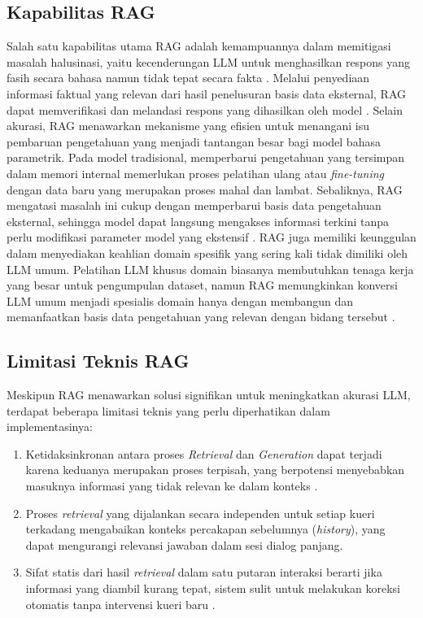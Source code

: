 \subsection{Kapabilitas RAG}
Salah satu kapabilitas utama RAG adalah kemampuannya dalam memitigasi masalah halusinasi, yaitu kecenderungan LLM untuk menghasilkan respons yang fasih secara bahasa namun tidak tepat secara fakta \parencite{Wu2024Retrieval}. Melalui penyediaan informasi faktual yang relevan dari hasil penelusuran basis data eksternal, RAG dapat memverifikasi dan melandasi respons yang dihasilkan oleh model \parencite{Wu2024Retrieval}.
Selain akurasi, RAG menawarkan mekanisme yang efisien untuk menangani isu pembaruan pengetahuan yang menjadi tantangan besar bagi model bahasa parametrik. Pada model tradisional, memperbarui pengetahuan yang tersimpan dalam memori internal memerlukan proses pelatihan ulang atau \textit{fine-tuning} dengan data baru yang merupakan proses mahal dan lambat. Sebaliknya, RAG mengatasi masalah ini cukup dengan memperbarui basis data pengetahuan eksternal, sehingga model dapat langsung mengakses informasi terkini tanpa perlu modifikasi parameter model yang ekstensif \parencite{Wu2024Retrieval}.
RAG juga memiliki keunggulan dalam menyediakan keahlian domain spesifik yang sering kali tidak dimiliki oleh LLM umum. Pelatihan LLM khusus domain biasanya membutuhkan tenaga kerja yang besar untuk pengumpulan dataset, namun RAG memungkinkan konversi LLM umum menjadi spesialis domain hanya dengan membangun dan memanfaatkan basis data pengetahuan yang relevan dengan bidang tersebut \parencite{Wu2024Retrieval}.


\subsection{Limitasi Teknis RAG}
Meskipun RAG menawarkan solusi signifikan untuk meningkatkan akurasi LLM, terdapat beberapa limitasi teknis yang perlu diperhatikan dalam implementasinya:

\begin{enumerate}[label=\arabic*.]
    \item Ketidaksinkronan antara proses \textit{Retrieval} dan \textit{Generation} dapat terjadi karena keduanya merupakan proses terpisah, yang berpotensi menyebabkan masuknya informasi yang tidak relevan ke dalam konteks \parencite{Gao2023Retrieval}.
    \item Proses \textit{retrieval} yang dijalankan secara independen untuk setiap kueri terkadang mengabaikan konteks percakapan sebelumnya (\textit{history}), yang dapat mengurangi relevansi jawaban dalam sesi dialog panjang.
    \item Sifat statis dari hasil \textit{retrieval} dalam satu putaran interaksi berarti jika informasi yang diambil kurang tepat, sistem sulit untuk melakukan koreksi otomatis tanpa intervensi kueri baru \parencite{Gao2023Retrieval}.
\end{enumerate}


